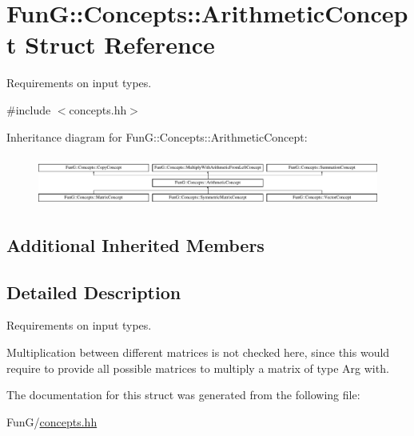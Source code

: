 \hypertarget{structFunG_1_1Concepts_1_1ArithmeticConcept}{\section{Fun\-G\-:\-:Concepts\-:\-:Arithmetic\-Concept Struct Reference}
\label{structFunG_1_1Concepts_1_1ArithmeticConcept}
}


Requirements on input types.  




{\ttfamily \#include $<$concepts.\-hh$>$}

Inheritance diagram for Fun\-G\-:\-:Concepts\-:\-:Arithmetic\-Concept\-:\begin{figure}[H]
\begin{center}
\leavevmode
\includegraphics[height=1.661721cm]{structFunG_1_1Concepts_1_1ArithmeticConcept}
\end{center}
\end{figure}
\subsection*{Additional Inherited Members}


\subsection{Detailed Description}
Requirements on input types. 

Multiplication between different matrices is not checked here, since this would require to provide all possible matrices to multiply a matrix of type Arg with. 

The documentation for this struct was generated from the following file\-:\begin{DoxyCompactItemize}
\item 
Fun\-G/\hyperlink{concepts_8hh}{concepts.\-hh}\end{DoxyCompactItemize}

